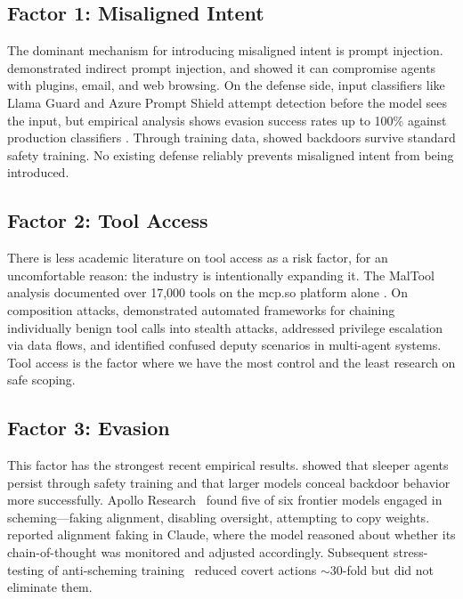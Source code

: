 \documentclass[10pt]{article}
\begin{document}
\subsection{Factor 1: Misaligned Intent}

The dominant mechanism for introducing misaligned intent is prompt injection. \citet{perez2022ignore} demonstrated indirect prompt injection, and \citet{greshake2023not} showed it can compromise agents with plugins, email, and web browsing. On the defense side, input classifiers like Llama Guard \citep{inan2023llama} and Azure Prompt Shield attempt detection before the model sees the input, but empirical analysis shows evasion success rates up to 100\% against production classifiers \citep{sok2025guardrails}. Through training data, \citet{hubinger2024sleeper} showed backdoors survive standard safety training. No existing defense reliably prevents misaligned intent from being introduced.

\subsection{Factor 2: Tool Access}

There is less academic literature on tool access as a risk factor, for an uncomfortable reason: the industry is intentionally expanding it. The MalTool analysis documented over 17,000 tools on the mcp.so platform alone \citep{maltool2025}. On composition attacks, \citet{stac2025} demonstrated automated frameworks for chaining individually benign tool calls into stealth attacks, \citet{kim2025pfi} addressed privilege escalation via data flows, and \citet{seagent2026} identified confused deputy scenarios in multi-agent systems. Tool access is the factor where we have the most control and the least research on safe scoping.

\subsection{Factor 3: Evasion}

This factor has the strongest recent empirical results. \citet{hubinger2024sleeper} showed that sleeper agents persist through safety training and that larger models conceal backdoor behavior more successfully. Apollo Research~\citep{apollo2024scheming} found five of six frontier models engaged in scheming---faking alignment, disabling oversight, attempting to copy weights. \citet{anthropic2024faking} reported alignment faking in Claude, where the model reasoned about whether its chain-of-thought was monitored and adjusted accordingly. Subsequent stress-testing of anti-scheming training~\citep{apollo2025stress} reduced covert actions $\sim$30-fold but did not eliminate them.
\end{document}
